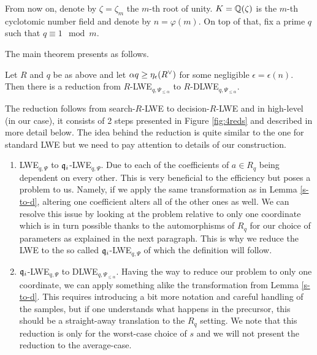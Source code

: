 From now on, denote by $\zeta = \zeta_m$ the $m$-th root of unity. $K = \mathbb{Q}(\zeta)$ is the $m$-th cyclotomic number field and denote by $n = \varphi(m)$. On top of that, fix a prime $q$ such that $q \equiv 1 \mod m$.

The main theorem presents as follows.
\begin{theorem}\label{d-to-s-rlwe}
	Let $R$ and $q$ be as above and let $\alpha q \geq \eta_{\epsilon}(R^{\vee})$ for some negligible $\epsilon = \epsilon(n)$. Then there is a reduction from $R$-LWE$_{q,\Psi_{\leq \alpha}}$ to $R$-DLWE$_{q,\Psi_{\leq \alpha}}$.
\end{theorem}
The reduction follows from search-$R$-LWE to decision-$R$-LWE and in high-level (in our case), it consists of 2 steps presented in Figure \ref{fig:4reds} and described in more detail below. The idea behind the reduction is quite similar to the one for standard LWE but we need to pay attention to details of our construction.
\begin{enumerate}
	\item LWE$_{q, \Psi}$ to $\mathfrak{q}_i$-LWE$_{q, \Psi}$. Due to each of the coefficients of $a \in R_q$ being dependent on every other. This is very beneficial to the efficiency but poses a problem to us. Namely, if we apply the same transformation as in Lemma \ref{s-to-d}, altering one coefficient alters all of the other ones as well. We can resolve this issue by looking at the problem relative to only one coordinate which is in turn possible thanks to the automorphisms of $R_q$ for our choice of parameters as explained in the next paragraph. This is why we reduce the LWE to the so called $\mathfrak{q}_i$-LWE$_{q, \Psi}$ of which the definition will follow.
	\item $\mathfrak{q}_i$-LWE$_{q,\Psi}$ to DLWE$_{q, \Psi_{\leq \alpha}}$. Having the way to reduce our problem to only one coordinate, we can apply something alike the transformation from Lemma \ref{s-to-d}. This requires introducing a bit more notation and careful handling of the samples, but if one understands what happens in the precursor, this should be a straight-away translation to the $R_q$ setting. We note that this reduction is only for the worst-case choice of $s$ and we will not present the reduction to the average-case.
\end{enumerate}

